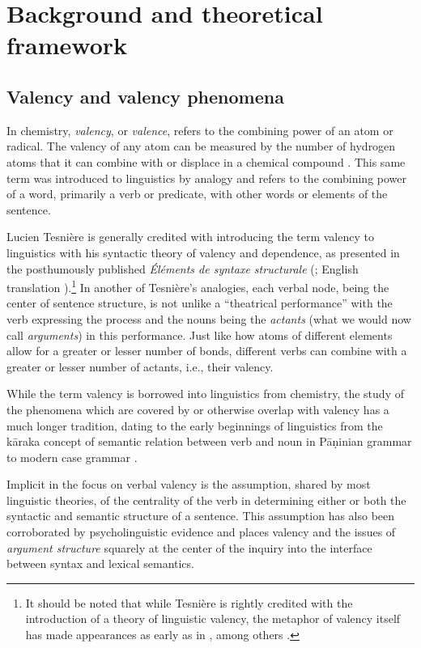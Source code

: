 \chapter{Background and theoretical framework}
\section{Valency and valency phenomena}


In chemistry, \textit{valency}, or \textit{valence}, refers to the combining power of an atom or radical. The valency of any atom can be measured by the number of hydrogen atoms that it can combine with or displace in a chemical compound \citep{law2020a}. This same term was introduced to linguistics by analogy and refers to the combining power of a word, primarily a verb or predicate, with other words or elements of the sentence. 

Lucien Tesnière is generally credited with introducing the term valency to linguistics with his syntactic theory of valency and dependence, as presented in the posthumously published \textit{Éléments de syntaxe structurale} (\cite*{tesniere1959}; English translation \cite*{tesniere2015}).\footnote{
    It should be noted that while Tesnière is rightly credited with the introduction of a theory of linguistic valency, the metaphor of valency itself has made appearances as early as in \citet{peirce1897}, among others \citep{przepiorkowski2018}.
}
In another of Tesnière's analogies, each verbal node, being the center of sentence structure, is not unlike a ``theatrical performance'' with the verb expressing the process and the nouns being the \textit{actants} (what we would now call \textit{arguments}) in this performance. Just like how atoms of different elements allow for a greater or lesser number of bonds, different verbs can combine with a greater or lesser number of actants, i.e., their valency.

While the term valency is borrowed into linguistics from chemistry, the study of the phenomena which are covered by or otherwise overlap with valency has a much longer tradition, dating to the early beginnings of linguistics from the kāraka concept of semantic relation between verb and noun \citep{ganeri2011a} in Pāṇinian grammar to modern case grammar \citep{fillmore1968}. 

Implicit in the focus on verbal valency is the assumption, shared by most linguistic theories, of the centrality of the verb in determining either or both the syntactic and semantic structure of a sentence. This assumption has also been corroborated by psycholinguistic evidence \citep{healy1970} and places valency and the issues of \textit{argument structure} squarely at the center of the inquiry into the interface between syntax and lexical semantics.

